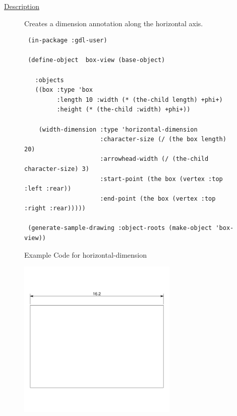 \documentclass [11pt]{book}
\begin{document}
\begin{itemize}
\begin{description}

\item [
\underline{Description}]


Creates a dimension annotation along the horizontal axis.



\end{description}




\begin{figure}
\begin{lrbox}{\boxedverb}
\begin{minipage}{\linewidth}
{\small

\begin{verbatim}          
 (in-package :gdl-user)

 (define-object  box-view (base-object)
   
   :objects
   ((box :type 'box
         :length 10 :width (* (the-child length) +phi+)
         :height (* (the-child :width) +phi+))
   
    (width-dimension :type 'horizontal-dimension
                     :character-size (/ (the box length) 20)
                     :arrowhead-width (/ (the-child character-size) 3)
                     :start-point (the box (vertex :top :left :rear))
                     :end-point (the box (vertex :top :right :rear)))))

 (generate-sample-drawing :object-roots (make-object 'box-view)) 
\end{verbatim}}
\end{minipage}
\end{lrbox}
\fbox{\usebox{\boxedverb}}

\caption{Example Code for horizontal-dimension}

\label{fig:example-code-horizontal-dimension}

\end{figure}

\begin{figure}
\begin{center}
\includegraphics[width=3in,height=3in]{../images/example-horizontal-dimension.pdf}
\end{center}


\end{figure}
\end{itemize}
\end{document}
